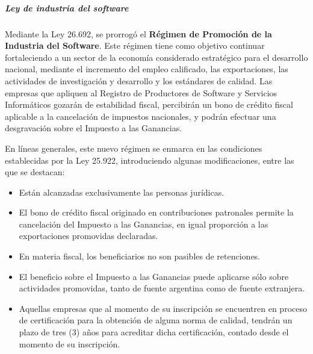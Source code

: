     
    
\subparagraph{Ley de industria del software}
    
    Mediante la Ley 26.692, se prorrogó el \textbf{Régimen de Promoción de la Industria del Software}.
    Este régimen tiene como objetivo continuar fortaleciendo a un sector de la economía considerado estratégico para el desarrollo nacional, mediante el incremento del empleo calificado, las exportaciones, las actividades de investigación y desarrollo y los estándares de calidad.
    Las empresas que apliquen al Registro de Productores de Software y Servicios Informáticos gozarán de estabilidad fiscal, percibirán un bono de crédito fiscal aplicable a la cancelación de impuestos nacionales, y podrán efectuar una desgravación sobre el Impuesto a las Ganancias.
    
    En líneas generales, este nuevo régimen se enmarca en las condiciones establecidas por la Ley 25.922, introduciendo algunas modificaciones, entre las que se destacan:
    \begin{itemize}
		\item Están alcanzadas exclusivamente las personas jurídicas.
        \item El bono de crédito fiscal originado en contribuciones patronales permite la cancelación del Impuesto a las Ganancias, en igual proporción a las exportaciones promovidas declaradas.
        \item En materia fiscal, los beneficiarios no son pasibles de retenciones.
        \item El beneficio sobre el Impuesto a las Ganancias puede aplicarse sólo sobre actividades promovidas, tanto de fuente argentina como de fuente extranjera.
        \item Aquellas empresas que al momento de su inscripción se encuentren en proceso de certificación para la obtención de alguna norma de calidad, tendrán un plazo de tres (3) años para acreditar dicha certificación, contado desde el momento de su inscripción.
	\end{itemize}
    
